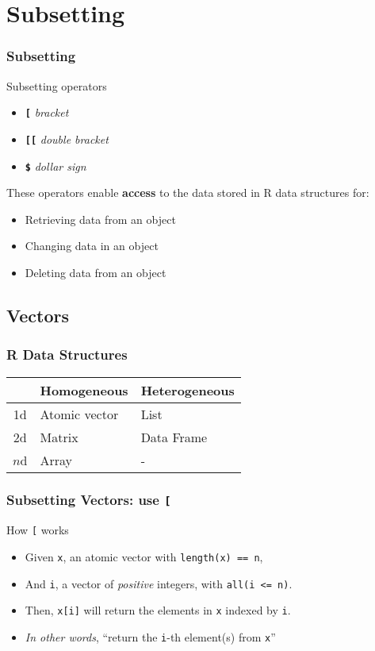\documentclass{beamer}
\newcommand{\R}[1]{\texttt{#1}}
\begin{document}
\section{Subsetting}
\begin{frame}
\frametitle{Subsetting}

Subsetting operators 
\begin{itemize}
\item \R{\textbf{[}} \textit{bracket}
\item \R{\textbf{[[}} \textit{double bracket}
\item \R{\textbf{\$}} \textit{dollar sign}
\end{itemize}
\pause
These operators enable \textbf{access} to the data stored in R data structures for:
\begin{itemize}
\item Retrieving data from an object
\item Changing data in an object
\item Deleting data from an object
\end{itemize}

\end{frame}



\subsection{Vectors}

\begin{frame}
\frametitle{R Data Structures}

\begin{table}
\begin{tabular}{c|ll}
   &  Homogeneous   & Heterogeneous \\ \hline
1d & \cellcolor{gray!25} Atomic vector &   List \\
2d & Matrix        & Data Frame \\
$n$d & Array       & - \\ 
\end{tabular}
\end{table}

\end{frame}


\begin{frame}[fragile]
\frametitle{Subsetting Vectors: use \R{[}}

How \R{[} works
\begin{itemize}
\item Given \R{x}, an atomic vector with \R{length(x) == n},
\item And \R{i}, a vector of \textit{positive} integers, with \R{all(i <= n)}.
\item Then, \R{x[i]} will return the elements in \R{x} indexed by \R{i}.
\item \textit{In other words}, ``return the \R{i}-th element(s) from \R{x}''
\end{itemize}

\end{frame}
\end{document}

